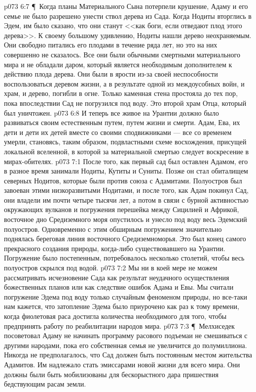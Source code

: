 \vs p073 6:7 \P\ Когда планы Материального Сына потерпели крушение, Адаму и его семье не было разрешено унести ствол дерева из Сада. Когда Нодиты вторглись в Эдем, им было сказано, что они станут <<как боги, если отведают плод этого дерева>>. К своему большому удивлению, Нодиты нашли дерево неохраняемым. Они свободно питались его плодами в течение ряда лет, но это на них совершенно не сказалось. Все они были обычными смертными материального мира и не обладали даром, который является необходимым дополнителем к действию плода дерева. Они были в ярости из\hyp{}за своей неспособности воспользоваться деревом жизни, а в результате одной из междоусобных войн, и храм, и дерево, погибли в огне. Только каменная стена простояла до тех пор, пока впоследствии Сад не погрузился под воду. Это второй храм Отца, который был уничтожен.
\vs p073 6:8 И теперь все живое на Урантии должно было развиваться своим естественным путем, путем жизни и смерти. Адам, Ева, их дети и дети их детей вместе со своими сподвижниками --- все со временем умерли, становясь, таким образом, подвластными схеме восхождения, присущей локальной вселенной, в которой за материальной смертью следует воскресение в мирах\hyp{}обителях.
\vs p073 7:1 После того, как первый сад был оставлен Адамом, его в разное время занимали Нодиты, Кутиты и Суниты. Позже он стал обиталищем северных Нодитов, которые были против союза с Адамитами. Полуостров был завоеван этими низкоразвитыми Нодитами, и после того, как Адам покинул Сад, они владели им почти четыре тысячи лет, а потом в связи с бурной активностью окружающих вулканов и погружения перешейка между Сицилией и Африкой, восточное дно Средиземного моря опустилось и унесло под воду весь Эдемский полуостров. Одновременно с этим обширным погружением значительно поднялась береговая линия восточного Средиземноморья. Это был конец самого прекрасного создания природы, когда\hyp{}либо существовавшего на Урантии. Погружение было постепенным, потребовалось несколько столетий, чтобы весь полуостров скрылся под водой.
\vs p073 7:2 Мы ни в коей мере не можем рассматривать исчезновение Сада как результат неудачного осуществления божественных планов или как следствие ошибок Адама и Евы. Мы считали погружение Эдема под воду только случайным феноменом природы, но все\hyp{}таки нам кажется, что затопление Эдема было приурочено как раз к тому времени, когда фиолетовая раса достигла количества необходимого для того, чтобы предпринять работу по реабилитации народов мира.
\vs p073 7:3 \P\ Мелхиседек посоветовал Адаму не начинать программу расового подъемаи не смешиваться с другими народами, пока его собственная семья не увеличится до полумиллиона. Никогда не предполагалось, что Сад должен быть постоянным местом жительства Адамитов. Им надлежало стать эмиссарами новой жизни для всего мира. Они должны были быть мобилизованы для бескорыстного дара пришествия бедствующим расам земли.
